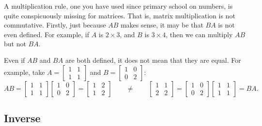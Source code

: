 A multiplication rule, one you have used since primary school on numbers,
is quite conspicuously missing for matrices.
That is, matrix multiplication is
not commutative.  Firstly, just because $AB$ makes sense, it may be
that $BA$ is not even defined.  For example, if $A$ is $2 \times 3$, and
$B$ is $3 \times 4$, then we can multiply $AB$ but not $BA$.

Even if $AB$ and $BA$ are both defined, it does not mean that they are equal.
For example, take
$A = \left[ \begin{smallmatrix} 1 & 1 \\ 1 & 1 \end{smallmatrix} \right]$
and
$B = \left[ \begin{smallmatrix} 1 & 0 \\ 0 & 2 \end{smallmatrix} \right]$:
\begin{equation*}
AB =
\begin{bmatrix} 1 & 1 \\ 1 & 1 \end{bmatrix}
\begin{bmatrix} 1 & 0 \\ 0 & 2 \end{bmatrix}
=
\begin{bmatrix} 1 & 2 \\ 1 & 2 \end{bmatrix}
\qquad
\neq
\qquad
\begin{bmatrix} 1 & 1 \\ 2 & 2 \end{bmatrix}
=
\begin{bmatrix} 1 & 0 \\ 0 & 2 \end{bmatrix}
\begin{bmatrix} 1 & 1 \\ 1 & 1 \end{bmatrix}
=
BA .
\end{equation*}

\subsection{Inverse}

